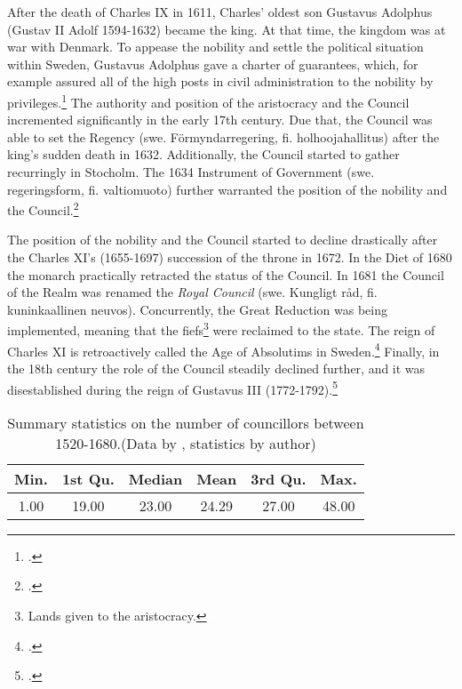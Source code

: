 After the death of Charles IX in 1611, Charles' oldest son Gustavus Adolphus (Gustav II Adolf 1594-1632) became the king. At that time, the kingdom was at war with Denmark. To appease the nobility and settle the political situation within Sweden, Gustavus Adolphus gave a charter of guarantees, which, for example assured all of the high posts in civil administration to the nobility by privileges.\footcites[pp. 121-123,]{pSuurvalta}[pp. 8-9.]{personalAgency} The authority and position of the aristocracy and the Council incremented significantly in the early 17th century. Due that, the Council was able to set the Regency (swe. Förmyndarregering, fi. holhoojahallitus) after the king's sudden death in 1632. Additionally, the Council started to gather recurringly in Stocholm. The 1634 Instrument of Government (swe. regeringsform, fi. valtiomuoto) further warranted the position of the nobility and the Council.\footcites[pp. 195-197,]{pSuurvalta}[pp. 16-17,]{agencyAndStateBuilding}[pp. 8-9.]{personalAgency}

The position of the nobility and the Council started to decline drastically after the Charles XI's (1655-1697) succession of the throne in 1672. In the Diet of 1680 the monarch practically retracted the status of the Council. In 1681 the Council of the Realm was renamed the \textit{Royal Council} (swe. Kungligt råd, fi. kuninkaallinen neuvos). Concurrently, the Great Reduction was being implemented, meaning that the fiefs\footnote{Lands given to the aristocracy.} were reclaimed to the state. The reign of Charles XI is retroactively called the Age of Absolutims in Sweden.\footcites[pp. 289-295,]{pSuurvalta}[pp. 8-9.]{personalAgency} Finally, in the 18th century the role of the Council steadily declined further, and it was disestablished during the reign of Gustavus III (1772-1792).\footcite[p. 14.]{hopesAndFearsIntro}

\begin{table}
	\caption[Summary statistics on the number of councillors between 1520-1680]{Summary statistics on the number of councillors between 1520-1680.(Data by \cite{councillorsDS}, statistics by author)}
	\label{tab:councillors}
	\centering
	\begin{tabular}{c c c c c c}
		\hline
		Min. & 1st Qu. & Median & Mean & 3rd Qu. & Max.\\
		\hline
		1.00 & 19.00 & 23.00 & 24.29 & 27.00 & 48.00\\
		\hline
	\end{tabular}
\end{table}

